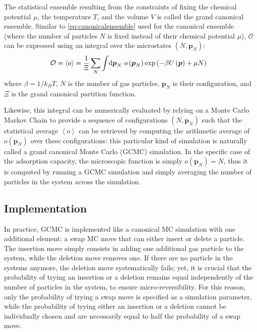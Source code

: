 \documentclass[main.tex]{subfiles}
\begin{document}
The statistical ensemble resulting from the constraints of fixing the chemical potential $\mu$, the temperature $T$, and the volume $V$ is called the grand canonical ensemble. Similar to \cref{eq:canonicalensemble} used for the canonical ensemble (where the number of particles $N$ is fixed instead of their chemical potential $\mu$), $\mathcal O$ can be expressed using an integral over the microstates $(N,\boldsymbol p_N)$:
\[\mathcal O = \left<o\right> = \frac1\Xi\sum_N\int\!\text d{\boldsymbol p_N}\  o\left({\boldsymbol p_N}\right)\exp\left(-\beta U\left({\boldsymbol p}\right) + \mu N\right)\label{eq:grandcanonicalensemble}\]
where $\beta = 1/k_BT$, $N$ is the number of gas particles, $\boldsymbol p_N$ is their configuration, and $\Xi$ is the grand canonical partition function.

Likewise, this integral can be numerically evaluated by relying on a Monte Carlo Markov Chain to provide a sequence of configurations $(N, \boldsymbol p_N)$ such that the statistical average $\left<o\right>$ can be retrieved by computing the arithmetic average of $o\left({\boldsymbol p_N}\right)$ over these configurations: this particular kind of simulation is naturally called a grand canonical Monte Carlo (GCMC) simulation. In the specific case of the adsorption capacity, the microscopic function is simply $o\left({\boldsymbol p_N}\right) = N$, thus it is computed by running a GCMC simulation and simply averaging the number of particles in the system across the simulation.

\subsection{Implementation}

In practice, GCMC is implemented like a canonical MC simulation with one additional element: a swap MC move that can either insert or delete a particle. The insertion move simply consists in adding one additional gas particle to the system, while the deletion move removes one. If there are no particle in the systems anymore, the deletion move systematically fails; yet, it is crucial that the probability of trying an insertion or a deletion remains equal independently of the number of particles in the system, to ensure micro-reversibility. For this reason, only the probability of trying a swap move is specified as a simulation parameter, while the probability of trying either an insertion or a deletion cannot be individually chosen and are necessarily equal to half the probability of a swap move.
\end{document}

